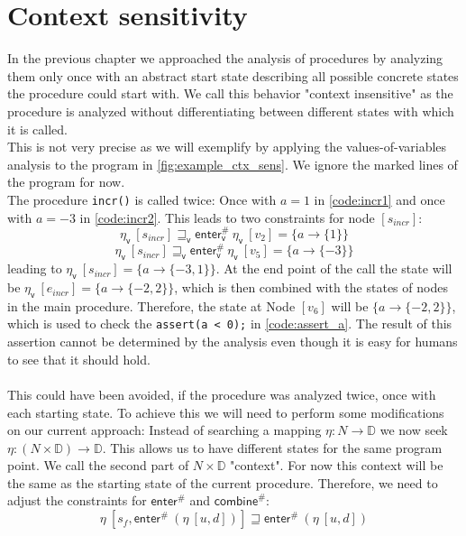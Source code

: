   \section{Context sensitivity}
    In the previous chapter we approached the analysis of procedures by analyzing them only once with an abstract start state describing all possible concrete states the procedure could start with. We call this behavior "context insensitive" as the procedure is analyzed without differentiating between different states with which it is called.\\
    This is not very precise as we will exemplify by applying the values-of-variables analysis to the program in \autoref{fig:example_ctx_sens}. We ignore the marked lines of the program for now.\\
    The procedure \texttt{incr()} is called twice: Once with $a = 1$ in \autoref{code:incr1} and once with $a = -3$ in \autoref{code:incr2}. This leads to two constraints for node $[s_{incr}]$: 
      \[\eta_\textsf{v}\ [s_{incr}] \sqsupseteq_\textsf{v} \textsf{enter}^{\#}_\textsf{v}\ \eta_\textsf{v}\ [v_2] = \{a \rightarrow \{1\} \} \]
      \[\eta_\textsf{v}\ [s_{incr}] \sqsupseteq_\textsf{v} \textsf{enter}^{\#}_\textsf{v}\ \eta_\textsf{v}\ [v_5] = \{a \rightarrow \{-3\} \} \]
    leading to $\eta_\textsf{v}\ [s_{incr}] = \{a \rightarrow \{-3, 1\}\}$. At the end point of the call the state will be $\eta_\textsf{v}\ [e_{incr}] = \{a \rightarrow \{-2, 2\}\}$, which is then combined with the states of nodes in the main procedure. Therefore, the state at Node $[v_6]$ will be $\{a \rightarrow \{-2, 2\}\}$, which is used to check the \texttt{assert(a < 0);} in \autoref{code:assert_a}. The result of this assertion cannot be determined by the analysis even though it is easy for humans to see that it should hold.\\
    \\
    This could have been avoided, if the procedure was analyzed twice, once with each starting state. To achieve this we will need to perform some modifications on our current approach: Instead of searching a mapping $\eta: N \rightarrow \mathbb{D}$ we now seek $\eta: (N \times \mathbb{D}) \rightarrow \mathbb{D}$. This allows us to have different states for the same program point. We call the second part of $N \times \mathbb{D}$ "context". For now this context will be the same as the starting state of the current procedure. Therefore, we need to adjust the constraints for $\textsf{enter}^{\#}$ and $\textsf{combine}^{\#}$:
    \[\eta\ [s_f, \textsf{enter}^{\#}\ (\eta\ [u, d])] \sqsupseteq \textsf{enter}^{\#}\ (\eta\ [u, d]) \]
